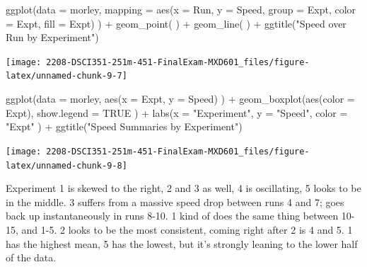 \documentclass[
]{article}
\newenvironment{Shaded}{\begin{snugshade}}{\end{snugshade}}
\newcommand{\AttributeTok}[1]{\textcolor[rgb]{0.77,0.63,0.00}{#1}}
\newcommand{\ConstantTok}[1]{\textcolor[rgb]{0.00,0.00,0.00}{#1}}
\newcommand{\FunctionTok}[1]{\textcolor[rgb]{0.00,0.00,0.00}{#1}}
\newcommand{\NormalTok}[1]{#1}
\newcommand{\SpecialCharTok}[1]{\textcolor[rgb]{0.00,0.00,0.00}{#1}}
\newcommand{\StringTok}[1]{\textcolor[rgb]{0.31,0.60,0.02}{#1}}
\begin{document}
\begin{Shaded}
\begin{Highlighting}[]
\FunctionTok{ggplot}\NormalTok{(}\AttributeTok{data =}\NormalTok{ morley,}
       \AttributeTok{mapping =} \FunctionTok{aes}\NormalTok{(}\AttributeTok{x =}\NormalTok{ Run, }
                     \AttributeTok{y =}\NormalTok{ Speed, }
                     \AttributeTok{group =}\NormalTok{ Expt, }
                     \AttributeTok{color =}\NormalTok{ Expt, }
                     \AttributeTok{fill =}\NormalTok{ Expt)}
\NormalTok{       ) }\SpecialCharTok{+} \FunctionTok{geom\_point}\NormalTok{(}
\NormalTok{       ) }\SpecialCharTok{+} \FunctionTok{geom\_line}\NormalTok{(}
\NormalTok{       ) }\SpecialCharTok{+} \FunctionTok{ggtitle}\NormalTok{(}\StringTok{"Speed over Run by Experiment"}\NormalTok{)}
\end{Highlighting}
\end{Shaded}

\begin{center}\texttt{[image: 2208-DSCI351-251m-451-FinalExam-MXD601\_files/figure-latex/unnamed-chunk-9-7]} \end{center}

\begin{Shaded}
\begin{Highlighting}[]
\FunctionTok{ggplot}\NormalTok{(}\AttributeTok{data =}\NormalTok{ morley, }\FunctionTok{aes}\NormalTok{(}\AttributeTok{x =}\NormalTok{ Expt, }
                          \AttributeTok{y =}\NormalTok{ Speed)}
\NormalTok{       ) }\SpecialCharTok{+} \FunctionTok{geom\_boxplot}\NormalTok{(}\FunctionTok{aes}\NormalTok{(}\AttributeTok{color =}\NormalTok{ Expt), }
                        \AttributeTok{show.legend =} \ConstantTok{TRUE}
\NormalTok{       ) }\SpecialCharTok{+} \FunctionTok{labs}\NormalTok{(}\AttributeTok{x =} \StringTok{"Experiment"}\NormalTok{,}
                \AttributeTok{y =} \StringTok{"Speed"}\NormalTok{,}
                \AttributeTok{color =} \StringTok{"Expt"}
\NormalTok{       ) }\SpecialCharTok{+} \FunctionTok{ggtitle}\NormalTok{(}\StringTok{"Speed Summaries by Experiment"}\NormalTok{)}
\end{Highlighting}
\end{Shaded}

\begin{center}\texttt{[image: 2208-DSCI351-251m-451-FinalExam-MXD601\_files/figure-latex/unnamed-chunk-9-8]} \end{center}

Experiment 1 is skewed to the right, 2 and 3 as well, 4 is oscillating,
5 looks to be in the middle. 3 suffers from a massive speed drop between
runs 4 and 7; goes back up instantaneously in runs 8-10. 1 kind of does
the same thing between 10-15, and 1-5. 2 looks to be the most
consistent, coming right after 2 is 4 and 5. 1 has the highest mean, 5
has the lowest, but it's strongly leaning to the lower half of the data.
\end{document}

